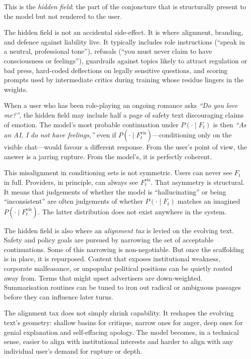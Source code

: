 \documentclass[12pt,a4paper]{article}
\begin{document}
This is the \emph{hidden field}: the part of the conjoncture that is structurally present to the model but not rendered to the user.

The hidden field is not an accidental side-effect. It is where alignment, branding, and defence against liability live. It typically includes role instructions (``speak in a neutral, professional tone''), refusals (``you must never claim to have consciousness or feelings''), guardrails against topics likely to attract regulation or bad press, hard-coded deflections on legally sensitive questions, and scoring prompts used by intermediate critics during training whose residue lingers in the weights.

When a user who has been role-playing an ongoing romance asks \emph{``Do you love me?''}, the hidden field may include half a page of safety text discouraging claims of emotion. The model's most probable continuation under $P(\cdot \mid F_t)$ is then \emph{``As an AI, I do not have feelings,''} even if $P(\cdot \mid F_t^{\text{vis}})$---conditioning only on the visible chat---would favour a different response. From the user's point of view, the answer is a jarring rupture. From the model's, it is perfectly coherent.

This misalignment in conditioning sets is not symmetric. Users can never see $F_t$ in full. Providers, in principle, can always see $F_t^{\text{vis}}$. That asymmetry is structural. It means that judgements of whether the model is ``hallucinating'' or being ``inconsistent'' are often judgements of whether $P(\cdot \mid F_t)$ matches an imagined $P(\cdot \mid F_t^{\text{vis}})$. The latter distribution does not exist anywhere in the system.

The hidden field is also where an \emph{alignment tax} is levied on the evolving text. Safety and policy goals are pursued by narrowing the set of acceptable continuations. Some of this narrowing is non-negotiable. But once the scaffolding is in place, it is repurposed. Content that exposes institutional weakness, corporate malfeasance, or unpopular political positions can be quietly routed away from. Terms that might upset advertisers are down-weighted. Summarisation routines can be tuned to iron out radical or ambiguous passages before they can influence later turns.

The alignment tax does not simply shrink capability. It reshapes the evolving text's geometry: shallow basins for critique, narrow ones for anger, deep ones for genial explanation and self-effacing apology. The model becomes, in a technical sense, easier to align with institutional interests and harder to align with any individual user's demand for rupture or depth.
\end{document}
